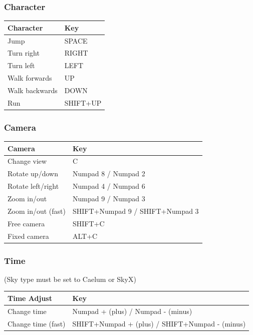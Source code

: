 \hypertarget{character}{%
\subsubsection{Character}\label{character}}
\begin{tabular}{ |l|l| } 
\hline
Character & Key \\
\hline
Jump & SPACE \\
\hline
Turn right & RIGHT \\
\hline
Turn left & LEFT \\
\hline
Walk forwards & UP \\
\hline
Walk backwards & DOWN \\
\hline
Run & SHIFT+UP \\
\hline
\end{tabular}

\hypertarget{camera}{%
\subsubsection{Camera}\label{camera}}

\begin{tabular}{ |l|l| } 
\hline
Camera & Key \\
\hline
Change view & C \\
\hline
Rotate up/down & Numpad 8 / Numpad 2 \\
\hline
Rotate left/right & Numpad 4 / Numpad 6 \\
\hline
Zoom in/out & Numpad 9 / Numpad 3 \\
\hline
Zoom in/out (fast) & SHIFT+Numpad 9 / SHIFT+Numpad 3 \\
\hline
Free camera & SHIFT+C \\
\hline
Fixed camera & ALT+C \\
\hline
\end{tabular}

\hypertarget{time}{%
\subsubsection{Time}\label{time}}

(Sky type must be set to Caelum or SkyX)

\begin{tabular}{ |l|l| } 
\hline
Time Adjust & Key \\
\hline
Change time & Numpad + (plus) / Numpad - (minus) \\
\hline
Change time (fast) & SHIFT+Numpad + (plus) / SHIFT+Numpad - (minus) \\
\hline
\end{tabular}

